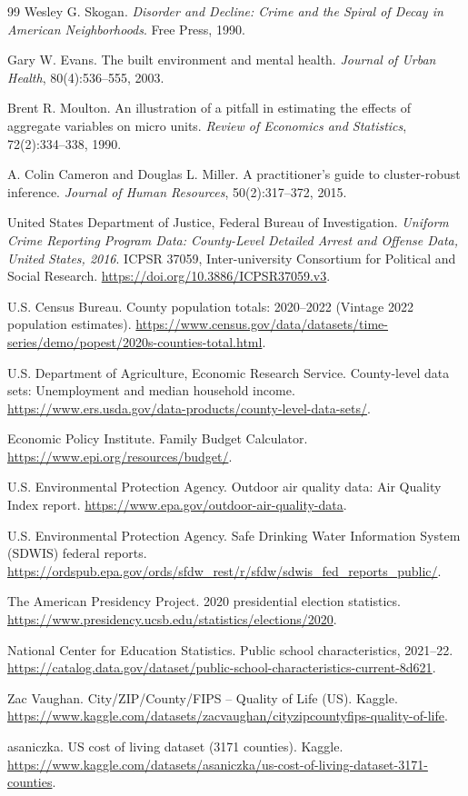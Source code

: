 \documentclass[12pt,letterpaper]{report}
\begin{document}
\begin{thebibliography}{99}
 Wesley G. Skogan. \textit{Disorder and Decline: Crime and the Spiral
of Decay in American Neighborhoods}. Free Press, 1990.

 Gary W. Evans. The built environment and mental health. \textit{Journal
of Urban Health}, 80(4):536--555, 2003.

 Brent R. Moulton. An illustration of a pitfall in estimating the
effects of aggregate variables on micro units. \textit{Review of Economics and Statistics},
72(2):334--338, 1990.

 A. Colin Cameron and Douglas L. Miller. A practitioner's guide to
cluster-robust inference. \textit{Journal of Human Resources}, 50(2):317--372, 2015.

 United States Department of Justice, Federal Bureau of Investigation.
\textit{Uniform Crime Reporting Program Data: County-Level Detailed Arrest and Offense Data,
United States, 2016}. ICPSR 37059, Inter-university Consortium for Political and Social
Research. \url{https://doi.org/10.3886/ICPSR37059.v3}.

 U.S. Census Bureau. County population totals: 2020--2022 (Vintage
2022 population estimates).
\url{https://www.census.gov/data/datasets/time-series/demo/popest/2020s-counties-total.html}.

 U.S. Department of Agriculture, Economic Research Service. County-level
data sets: Unemployment and median household income.
\url{https://www.ers.usda.gov/data-products/county-level-data-sets/}.

 Economic Policy Institute. Family Budget Calculator.
\url{https://www.epi.org/resources/budget/}.

 U.S. Environmental Protection Agency. Outdoor air quality data: Air
Quality Index report. \url{https://www.epa.gov/outdoor-air-quality-data}.

 U.S. Environmental Protection Agency. Safe Drinking Water Information
System (SDWIS) federal reports.
\url{https://ordspub.epa.gov/ords/sfdw_rest/r/sfdw/sdwis_fed_reports_public/}.

 The American Presidency Project. 2020 presidential election statistics.
\url{https://www.presidency.ucsb.edu/statistics/elections/2020}.

 National Center for Education Statistics. Public school characteristics,
2021--22. \url{https://catalog.data.gov/dataset/public-school-characteristics-current-8d621}.

 Zac Vaughan. City/ZIP/County/FIPS -- Quality of Life (US). Kaggle.
\url{https://www.kaggle.com/datasets/zacvaughan/cityzipcountyfips-quality-of-life}.

 asaniczka. US cost of living dataset (3171 counties). Kaggle.
\url{https://www.kaggle.com/datasets/asaniczka/us-cost-of-living-dataset-3171-counties}.

\end{thebibliography}
\end{document}
